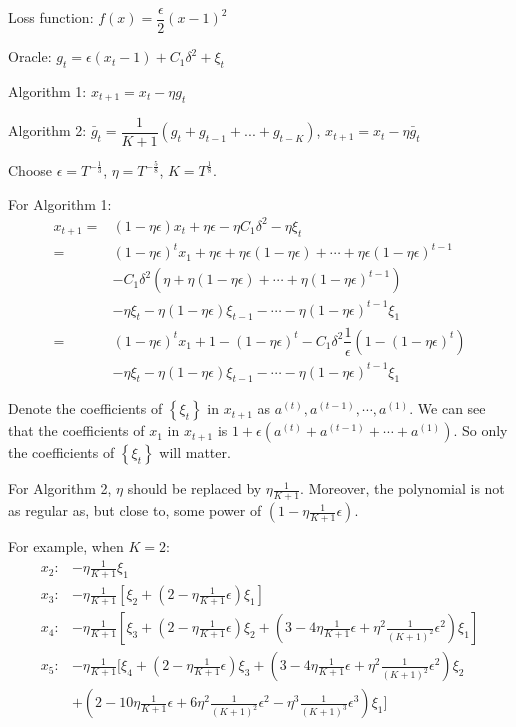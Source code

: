 \documentclass[11pt,letterpaper,english]{article}
\begin{document}
Loss function: $f(x) = \dfrac{\epsilon}{2} (x-1)^2$

Oracle: $g_t = \epsilon (x_t-1) + C_1 \delta^2 + \xi_t$

Algorithm 1: $ x_{t+1} = x_t - \eta  g_t$

Algorithm 2: $\bar{g}_t = \dfrac{1}{K+1}  (g_t + g_{t-1} + ... + g_{t-K})$, 
$x_{t+1} = x_t - \eta  \bar{g}_t$

Choose $\epsilon = T^{-\frac{1}{3}}$, $\eta = T^{-\frac{5}{8}}$, $K = T^{\frac{1}{8}}$.

For Algorithm 1:
\begin{align*}
x_{t+1} =& (1-\eta \epsilon) x_{t} + \eta \epsilon - \eta C_1 \delta^2-\eta \xi_{t}\\
=&  \left(1-\eta \epsilon\right)^t x_1+ \eta \epsilon+\eta \epsilon\left(1-\eta \epsilon\right)+\cdots + \eta \epsilon\left(1-\eta \epsilon\right)^{t-1}\\
&-C_1 \delta^2\left( \eta + \eta\left( 1-\eta \epsilon \right)+\cdots + \eta \left(1-\eta \epsilon\right)^{t-1} \right) \\
&-\eta \xi_t -\eta \left(1-\eta \epsilon\right)\xi_{t-1}- \cdots -\eta \left(1-\eta \epsilon\right)^{t-1}\xi_{1}\\
=& \left(1-\eta \epsilon\right)^t x_1+ 1-\left(1-\eta \epsilon \right)^t
-C_1 \delta^2 \dfrac{1}{\epsilon}\left( 1-\left(1-\eta \epsilon \right)^t \right)\\
&- \eta \xi_t -\eta \left(1-\eta \epsilon\right)\xi_{t-1}- \cdots -\eta \left(1-\eta \epsilon\right)^{t-1}\xi_{1}
\end{align*}

Denote the coefficients of $\left\lbrace\xi_t\right\rbrace$ in $x_{t+1}$ as $a^{(t)}, a^{(t-1)},\cdots,a^{(1)}$. We can see that the coefficients of $x_1$ in $x_{t+1}$ is $1+\epsilon (a^{(t)}+ a^{(t-1)}+\cdots + a^{(1)})$. So only the coefficients of $\left\lbrace\xi_t\right\rbrace$ will matter.

For Algorithm 2, $\eta$ should be replaced by $\eta \frac{1}{K+1}$. Moreover, the polynomial is not as regular as, but close to, some power of $\left(1-\eta \frac{1}{K+1} \epsilon\right)$.

For example, when $K=2$:
\begin{align*}
x_2: &-\eta \frac{1}{K+1} \xi_1 \\
x_3: &-\eta \frac{1}{K+1} \left[ \xi_2 + \left( 2- \eta \frac{1}{K+1}\epsilon\right)\xi_1\right]\\
x_4: &-\eta \frac{1}{K+1} \left[ \xi_3 + \left( 2- \eta \frac{1}{K+1}\epsilon\right)\xi_2+ \left( 3- 4\eta \frac{1}{K+1}\epsilon+\eta^2 \frac{1}{(K+1)^2}\epsilon^2\right)\xi_1\right]\\
x_5: &-\eta \frac{1}{K+1} [ \xi_4 + \left( 2- \eta \frac{1}{K+1}\epsilon\right)\xi_3+\left( 3- 4\eta \frac{1}{K+1}\epsilon+\eta^2 \frac{1}{(K+1)^2}\epsilon^2\right)\xi_2  \\
&+ \left( 2- 10\eta \frac{1}{K+1}\epsilon+6\eta^2 \frac{1}{(K+1)^2}\epsilon^2-\eta^3 \frac{1}{(K+1)^3}\epsilon^3\right)\xi_1]
\end{align*}
\end{document}

